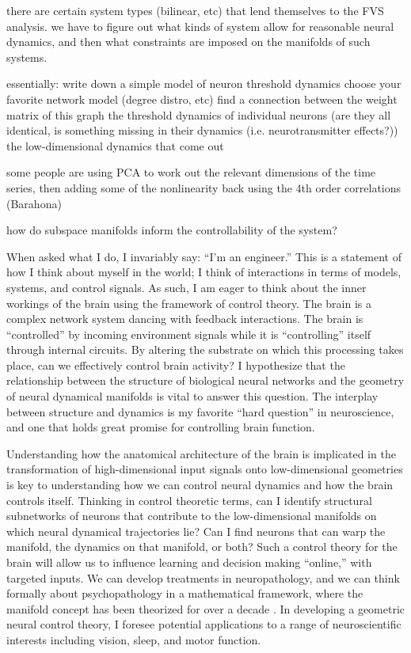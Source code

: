 \documentclass[a4paper,12pt]{article}
\begin{document}
	there are certain system types (bilinear, etc) that lend themselves to the FVS analysis. we have to figure out what kinds of system allow for reasonable neural dynamics, and then what constraints are imposed on the manifolds of such systems. 


essentially:
	write down a simple model of neuron threshold dynamics 
	choose your favorite network model (degree distro, etc)
	find a connection between 
		the weight matrix of this graph 
		the threshold dynamics of individual neurons (are they all identical, is something missing in their dynamics (i.e. neurotransmitter effects?))
		the low-dimensional dynamics that come out

some people are using PCA to work out the relevant dimensions of the time series, then adding some of the nonlinearity back using the 4th order correlations (Barahona)

how do subspace manifolds inform the controllability of the system? 


When asked what I do, I invariably say: ``I'm an engineer.'' This is a statement of how I think about myself in the world; I think of interactions in terms of models, systems, and control signals. As such, I am eager to think about the inner workings of the brain using the framework of control theory. The brain is a complex network system dancing with feedback interactions. The brain is ``controlled'' by incoming environment signals while it is ``controlling'' itself through internal circuits. By altering the substrate on which this processing takes place, can we effectively control brain activity? I hypothesize that the relationship between the structure of biological neural networks and the geometry of neural dynamical manifolds is vital to answer this question. The interplay between structure and dynamics is my favorite ``hard question'' in neuroscience, and one that holds great promise for controlling brain function. 


Understanding how the anatomical architecture of the brain is implicated in the transformation of high-dimensional input signals onto low-dimensional geometries is key to understanding how we can control neural dynamics and how the brain controls itself. Thinking in control theoretic terms, can I identify structural subnetworks of neurons that contribute to the low-dimensional manifolds on which neural dynamical trajectories lie? Can I find neurons that can warp the manifold, the dynamics on that manifold, or both? Such a control theory for the brain will allow us to influence learning and decision making ``online,'' with targeted inputs. We can develop treatments in neuropathology, and we can think formally about psychopathology in a mathematical framework, where the manifold concept has been theorized for over a decade \cite{Gallese2003}. In developing a geometric neural control theory, I foresee potential applications to a range of neuroscientific interests including vision, sleep, and motor function. 
\end{document}
